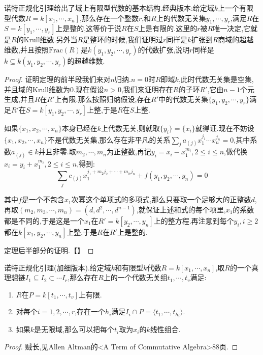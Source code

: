 诺特正规化引理给出了域上有限型代数的基本结构.经典版本:给定域$k$上一个有限型代数$R=k[x_1,\cdots,x_n]$,那么存在一个整数$r$,和$R$上的代数无关集$y_1,\cdots,y_r$,满足$R$在$S=k[y_1,\cdots,y_r]$上是整的,这等价于说$R$在$S$上是有限的.这里的$r$被$R$唯一决定,它就是$R$的Krull维数.另外当$R$是整环的时候,我们证明过$r$同样是$k$扩张到$R$商域的超越维数,并且按照$\mathrm{Frac}(R)$是$k(y_1,y_2,\cdots,y_r)$的代数扩张,说明$r$同样是$k\subseteq k(y_1,y_2,\cdots,y_r)$的超越维数.
\begin{proof}
	
	证明定理的前半段我们来对$n$归纳.$n=0$时$R$即域$k$,此时代数无关集是空集,并且域的Krull维数为0.现在假设$n>0$,我们来证明存在$R$的子环$R'$,它由$n-1$个元生成,并且$R$在$R'$上有限.那么按照归纳假设,存在$R'$中的代数无关集$\{y_1,y_2,\cdots,y_r\}$满足$R'$在$S=k[y_1,y_2,\cdots,y_r]$上整,于是$R$在$S$上整.
	
	如果$\{x_1,x_2,\cdots,x_n\}$本身已经在$k$上代数无关,则就取$\{y_i\}=\{x_i\}$就得证.现在不妨设$\{x_1,x_2,\cdots,x_n\}$不是代数无关集,那么存在非平凡的关系$\sum_ja_{(j)}x_1^{j_1}\cdots x_n^{j_n}=0$,其中系数$a_{(j)}\in k$并且非零.取$m_2,\cdots,m_n$为正整数,再记$y_i=x_i-x_1^{m_i},2\le i\le n$,做代换$x_i=y_i+x_1^{m_i},2\le i\le n$,得到:
	$$\sum_j c_{(j)}x_1^{j_1+m_2j_2+\cdots+m_nj_n}+f(y_1,y_2,\cdots,y_n)=0$$
	
	其中$f$是一个不包含$x_1$次幂这个单项式的多项式,那么只要取一个足够大的正整数$d$,再取$(m_2,m_3,\cdots,m_n)=(d,d^2,\cdots,d^{n-1})$,就保证上述和式的每个项里,$x_1$的系数都是不同的,于是这是一个$x_1$在$R'=k[y_2,\cdots,y_n]$上的整方程.再注意到每个$y_i,i\ge2$都在$k[x_1,y_2,\cdots,y_n]$上整,于是$R$在$R'$上是整的.
	
	定理后半部分的证明.【】
\end{proof}

诺特正规化引理(加细版本).给定域$k$和有限型$k$代数$R=k[x_1,\cdots,x_n]$,取$R$的一个真理想链$I_1\subseteq I_2\subset\cdots I_r$,那么存在$R$上的一个代数无关组$t_1,\cdots,t_v$满足:
\begin{enumerate}
	\item $R$在$P=k[t_1,\cdots,t_v]$上有限.
	\item 对每个$i=1,2,\cdots,r$,存在一个$h_i$满足$I_i\cap P=\langle t_1,\cdots,t_{h_i}\rangle$.
	\item 如果$k$是无限域,那么可以把每个$t_i$取为$x_i$的$k$线性组合.
\end{enumerate}
\begin{proof}
	
	贼长,见Allen Altman的<A Term of Commutative Algebra>88页.
\end{proof}

